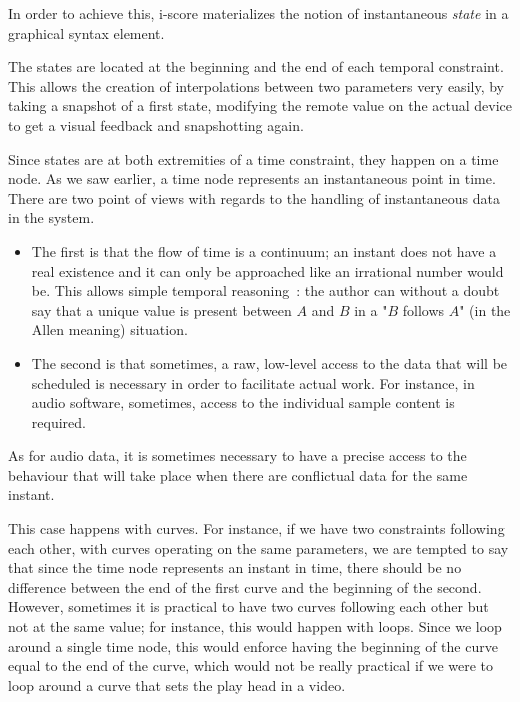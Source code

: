 \documentclass{sigchi}
\begin{document}
In order to achieve this, i-score materializes the notion of instantaneous \textit{state} in a graphical syntax element.

The states are located at the beginning and the end of each temporal constraint. This allows the creation of interpolations between two parameters very easily, by taking a snapshot of a first state, modifying the remote value on the actual device to get a visual feedback and snapshotting again. 

Since states are at both extremities of a time constraint, they happen on a time node. As we saw earlier, a time node represents an instantaneous point in time. 
There are two point of views with regards to the handling of instantaneous data in the system.

\begin{itemize}
	\item The first is that the flow of time is a continuum; an instant does not have a real existence and it can only be approached like an irrational number would be.
	This allows simple temporal reasoning~: the author can without a doubt say that a unique value is present between $A$ and $B$ in a "$B$ follows $A$" (in the Allen meaning) situation.
	\item The second is that sometimes, a raw, low-level access to the data that will be scheduled is necessary in order to facilitate actual work. For instance, in audio software, sometimes, access to the individual sample content is required.
\end{itemize}
As for audio data, it is sometimes necessary to have a precise access to the behaviour that will take place when there are conflictual data for the same instant. %

This case happens with curves. For instance, if we have two constraints following each other, with curves operating on the same parameters, we are tempted to say that since the time node represents an instant in time, there should be no difference between the end of the first curve and the beginning of the second. However, sometimes it is practical to have two curves following each other but not at the same value; for instance, this would happen with loops. Since we loop around a single time node, this would enforce having the beginning of the curve equal to the end of the curve, which would not be really practical if we were to loop around a curve that sets the play head in a video.
\end{document}
